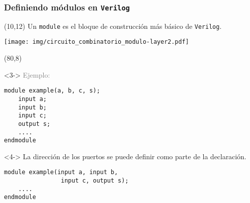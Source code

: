 \documentclass[aspectratio=169]{beamer}
\begin{document}
\begin{frame}[fragile,t]
    \begin{center}
    \end{center}
\end{frame}

\begin{frame}[fragile,t]
    \frametitle{Definiendo módulos en \texttt{Verilog}}
    \begin{textblock}{60}(10,12)
    Un \textcolor{naranjauca}{\texttt{module}} es el bloque de construcción más básico de \texttt{Verilog}.\\
    \begin{center}
    \texttt{[image: img/circuito\_combinatorio\_modulo-layer2.pdf]}
    \end{center}
    \end{textblock}
    \begin{textblock}{67}(80,8)
    \begin{onlyenv}<3->
    \textcolor{gray}{Ejemplo:}
\begin{lstlisting}
module example(a, b, c, s);
    input a;
    input b;
    input c;
    output s;
    ....
endmodule
\end{lstlisting}
    \end{onlyenv}
    \begin{onlyenv}<4->
    La dirección de los puertos se puede definir como parte de la declaración.
\begin{lstlisting}
module example(input a, input b,
                input c, output s);
    ....
endmodule
\end{lstlisting}
    \end{onlyenv}
    \end{textblock}
\end{frame}
\end{document}
